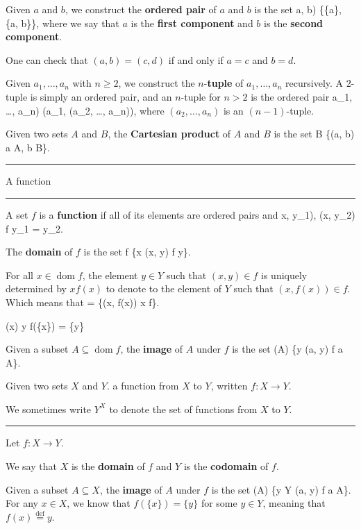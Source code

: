 \documentclass[12pt]{article}
\newcommand{\keyword}[1]{\textbf{#1}}
\def\[#1\]{\begin{align*}#1\end{align*}}
\newcommand{\sepline}{\rule{\textwidth}{0.4pt}}
\theoremstyle{definition}
\newcommand{\defeq}{\overset{\text{def}}{=}}
\newcommand{\<}{\left\langle}
\renewcommand{\>}{\right\rangle}
\DeclareMathOperator{\dom}{dom}
\begin{document}
\newpage

Given $a$ and $b$, we construct the \keyword{ordered pair} of $a$ and $b$ is the set
\[
    (a, b) \defeq \{\{a\}, \{a, b\}\},
\]
where we say that $a$ is the \keyword{first component} and $b$ is the \keyword{second component}.

One can check that $(a, b) = (c, d)$ if and only if $a = c$ and $b = d$.

Given $a_1, \dots, a_n$ with $n \geq 2$, we construct the $n$-\keyword{tuple} of $a_1, \dots, a_n$ recursively. A $2$-tuple is simply an ordered pair, and an $n$-tuple for $n > 2$ is the ordered pair
\[
    (a_1, \dots, a_n) \defeq (a_1, (a_2, \dots, a_n)),
\]
where $(a_2, \dots, a_n)$ is an $(n-1)$-tuple.



Given two sets $A$ and $B$, the \keyword{Cartesian product} of $A$ and $B$ is the set
\[
    A \times B \defeq \{(a, b) \mid a \in A,\; b \in B\}.
\]

\sepline

A function

\sepline

A set $f$ is a \keyword{function} if all of its elements are ordered pairs and
\[
    (x, y_1), (x, y_2) \in f \implies y_1 = y_2.
\]

The \keyword{domain} of $f$ is the set
\[
    \dom f \defeq \{x \mid (x, y) \in f  y\}.
\]

For all $x \in \dom f$, the element $y \in Y$ such that $(x, y) \in f$ is uniquely determined by $x$$f(x)$ to denote to the element of $Y$ such that $(x, f(x)) \in f$. Which means that
\[
    f = \{(x, f(x)) \mid x \in \dom f\}.
\]

\[
    f(x) \defeq y \iff f(\{x\}) = \{y\}
\]


Given a subset $A \subseteq \dom f$, the \keyword{image} of $A$ under $f$ is the set
\[
    f(A) \defeq \{y \mid (a, y) \in f  a \in A\}.
\]

Given two sets $X$ and $Y$.
a function from $X$ to $Y$, written  $f : X \to Y$.

We sometimes write $Y^X$ to denote the set of functions from $X$ to $Y$.

\sepline

Let $f : X \to Y$.

We say that $X$ is the \keyword{domain} of $f$ and $Y$ is the \keyword{codomain} of $f$. 

Given a subset $A \subseteq X$, the \keyword{image} of $A$ under $f$ is the set
\[
    f(A) \defeq \{y \in Y \mid (a, y) \in f  a \in A\}.
\]
For any $x \in X$, we know that $f(\{x\}) = \{y\}$ for some $y \in Y$, meaning that $f(x) \defeq y$.
\end{document}
